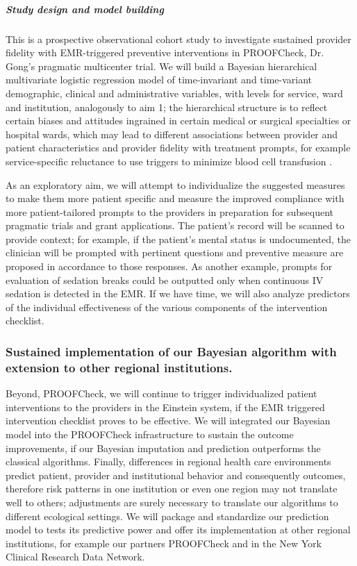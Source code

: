 \documentclass[11pt,notitlepage]{article}
\begin{document}
\subparagraph*{Study design and model building}
This is a prospective observational cohort study to investigate sustained provider fidelity with EMR-triggered preventive interventions in PROOFCheck, Dr. Gong's pragmatic multicenter trial. We will build a Bayesian hierarchical multivariate logistic regression model of time-invariant and time-variant demographic, clinical  and administrative variables, with levels for service, ward and institution, analogously to aim 1; the hierarchical structure is to reflect certain biases and attitudes ingrained in certain medical or surgical specialties or hospital wards, which may lead to different associations between provider and patient characteristics and provider fidelity with treatment prompts, for example service-specific reluctance to use triggers to minimize blood cell transfusion \cite{Goodnough_23706801}. 

As an exploratory aim, we will attempt to individualize the suggested measures to make them more patient specific and measure the improved compliance with more patient-tailored prompts to the providers in preparation for subsequent pragmatic trials and grant applications. The patient's record will be scanned to provide context; for example, if the patient's mental status is undocumented, the clinician will be prompted with pertinent questions and preventive measure are proposed in accordance to those responses. As another example, prompts for evaluation of sedation breaks could be outputted only when continuous IV sedation is detected in the EMR. If we have time, we will also analyze predictors of the individual effectiveness of the various components of the intervention checklist. 

\subsubsection*{Sustained implementation of our Bayesian algorithm with extension to other regional institutions.}
Beyond, PROOFCheck, we will continue to trigger individualized patient interventions to the providers in the Einstein system, if the EMR triggered intervention checklist proves to be effective. We will integrated our Bayesian model into the PROOFCheck infrastructure to sustain the outcome improvements, if our Bayesian imputation and prediction outperforms the classical algorithms. Finally, differences in regional health care environments predict patient, provider and institutional behavior and consequently outcomes, therefore risk patterns in one institution or even one region may not translate well to others; adjustments are surely necessary to translate our algorithms to different ecological settings. We will package and standardize our prediction model to tests its predictive power and offer its implementation at other regional institutions, for example our partners PROOFCheck and in the New York Clinical Research Data Network. 
\end{document}
